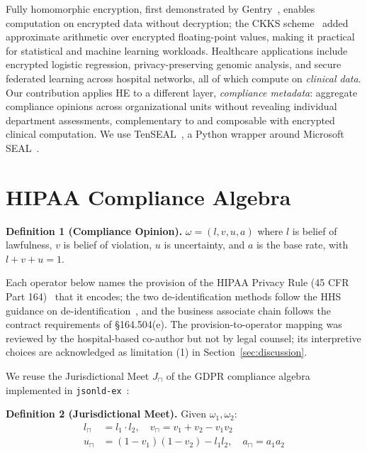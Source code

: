 \documentclass[conference]{IEEEtran}
\begin{document}
Fully homomorphic encryption, first demonstrated by Gentry~\cite{gentry2009fhe}, enables computation on encrypted data without decryption; the CKKS scheme~\cite{cheon2017ckks} added approximate arithmetic over encrypted floating-point values, making it practical for statistical and machine learning workloads. Healthcare applications include encrypted logistic regression, privacy-preserving genomic analysis, and secure federated learning across hospital networks, all of which compute on \emph{clinical data}. Our contribution applies HE to a different layer, \emph{compliance metadata}: aggregate compliance opinions across organizational units without revealing individual department assessments, complementary to and composable with encrypted clinical computation. We use TenSEAL~\cite{tenseal2021}, a Python wrapper around Microsoft SEAL~\cite{seal2022}.

\section{HIPAA Compliance Algebra}

\textbf{Definition 1 (Compliance Opinion).} $\omega = (l, v, u, a)$ where $l$ is belief of lawfulness, $v$ is belief of violation, $u$ is uncertainty, and $a$ is the base rate, with $l + v + u = 1$.

Each operator below names the provision of the HIPAA Privacy Rule (45 CFR Part 164)~\cite{hipaa_privacy} that it encodes; the two de-identification methods follow the HHS guidance on de-identification~\cite{hhs2012deid}, and the business associate chain follows the contract requirements of \S164.504(e). The provision-to-operator mapping was reviewed by the hospital-based co-author but not by legal counsel; its interpretive choices are acknowledged as limitation (1) in Section~\ref{sec:discussion}.

We reuse the Jurisdictional Meet $J_\sqcap$ of the GDPR compliance algebra implemented in \texttt{jsonld-ex}~\cite{syed2026jsonldex}:

\textbf{Definition 2 (Jurisdictional Meet).} Given $\omega_1, \omega_2$:
\begin{align}
l_\sqcap &= l_1 \cdot l_2, \quad
v_\sqcap = v_1 + v_2 - v_1 v_2 \label{eq:jmeet}\\
u_\sqcap &= (1{-}v_1)(1{-}v_2) - l_1 l_2, \quad
a_\sqcap = a_1 a_2 \nonumber
\end{align}
\end{document}
